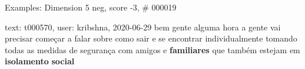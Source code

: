 \begin{frame}{Examples: Dimension 5 neg, score -3, \# 000019}
\footnotesize
\begin{alertblock}{text: t000570, user: kribshna, 2020-06-29}
bem gente alguma hora a gente vai precisar começar a falar sobre como sair e se 
encontrar individualmente tomando todas as medidas de segurança com amigos e 
\textbf{familiares} que também estejam em \textbf{isolamento} \textbf{social} 
\end{alertblock}
\end{frame}
